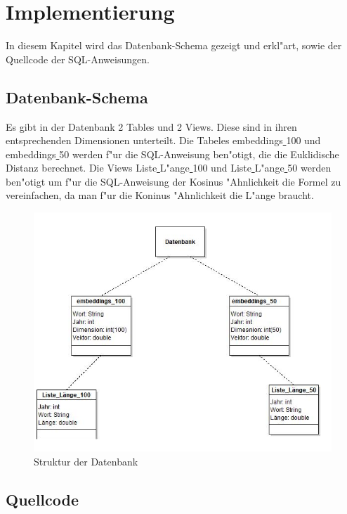 
\chapter{Implementierung}

In diesem Kapitel wird das Datenbank-Schema gezeigt und erkl"art, sowie der Quellcode der SQL-Anweisungen.\\

\section{Datenbank-Schema}
Es gibt in der Datenbank 2 Tables und 2 Views. Diese sind in ihren entsprechenden Dimensionen unterteilt. Die Tabeles embeddings\underline{  }100 und embeddings\underline{ }50 werden f"ur die SQL-Anweisung ben"otigt, die die Euklidische Distanz berechnet. Die Views Liste\underline{ }L"ange\underline{ }100 und Liste\underline{ }L"ange\underline{ }50 werden ben"otigt um f"ur die SQL-Anweisung der Kosinus "Ahnlichkeit die Formel zu vereinfachen, da man f"ur die Koninus "Ahnlichkeit die L"ange braucht.

\begin{figure}[bth] 
\includegraphics{Graphics/Datenbank.png}
\caption[Datenbank-Schema]{Struktur der Datenbank}
\end{figure}


\section{Quellcode}

